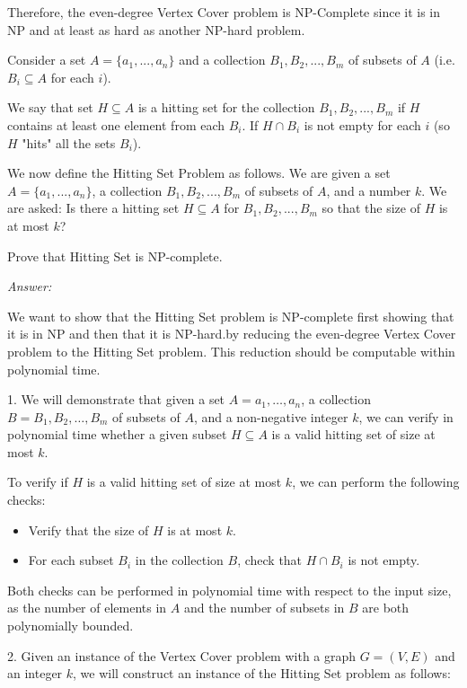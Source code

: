 \documentclass[12pt]{article}
\newenvironment{problem}[2][Problem]{\begin{trivlist}
\item[\hskip \labelsep {\bfseries #1}\hskip \labelsep {\bfseries #2.}]}{\end{trivlist}}
\begin{document}
Therefore, the even-degree Vertex Cover problem is NP-Complete since it is in NP and at least as hard as another NP-hard problem.

\begin{problem}{5}
    Consider a set $A=\{a_1,...,a_n\}$ and a collection $B_1,B_2,...,B_m$ of subsets of $A$ (i.e. $B_i \subseteq A$ for each $i$).

    We say that set $H\subseteq A$ is a hitting set for the collection $B_1,B_2,...,B_m$ if $H$ contains at least one element from each $B_i$. If $H \cap B_i$ is not empty for each $i$ (so $H$ "hits" all the sets $B_i$).
    
    We now define the Hitting Set Problem as follows. We are given a set $A=\{a_1,...,a_n\}$, a collection $B_1,B_2,...,B_m$ of subsets of $A$, and a number $k$. We are asked: Is there a hitting set $H \subseteq A$ for $B_1, B_2, ..., B_m$ so that the size of $H$ is at most $k$?

    Prove that Hitting Set is NP-complete.
\end{problem}

\textit{Answer:}

We want to show that the Hitting Set problem is NP-complete first showing that it is in NP and then that it is NP-hard.by reducing the even-degree Vertex Cover problem to the Hitting Set problem. This reduction should be computable within polynomial time.

1. We will demonstrate that given a set $A = {a_1, \ldots, a_n}$, a collection $B = {B_1, B_2, \ldots, B_m}$ of subsets of $A$, and a non-negative integer $k$, we can verify in polynomial time whether a given subset $H \subseteq A$ is a valid hitting set of size at most $k$.

To verify if $H$ is a valid hitting set of size at most $k$, we can perform the following checks:

\begin{itemize}
    \item Verify that the size of $H$ is at most $k$.
    \item For each subset $B_i$ in the collection $B$, check that $H \cap B_i$ is not empty.
\end{itemize}

Both checks can be performed in polynomial time with respect to the input size, as the number of elements in $A$ and the number of subsets in $B$ are both polynomially bounded.

2. Given an instance of the Vertex Cover problem with a graph $G=(V,E)$ and an integer $k$, we will construct an instance of the Hitting Set problem as follows:
\end{document}
